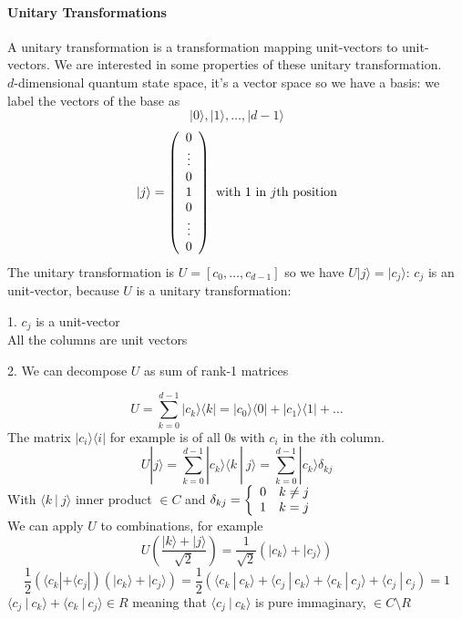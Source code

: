 \documentclass[10pt]{report}
\begin{document}
\paragraph{Unitary Transformations} A unitary transformation is a transformation mapping unit-vectors to unit-vectors. We are interested in some properties of these unitary transformation.\\
$d$-dimensional quantum state space, it's a vector space so we have a basis: we label the vectors of the base as $$|0\rangle, |1\rangle,\ldots,|d-1\rangle$$
$$|j\rangle = \left(\begin{array}{c}
0\\\vdots\\0\\1\\0\\\vdots\\0
\end{array}\right)\hbox{ with }1\hbox{ in }j\hbox{th position}$$
The unitary transformation is $U = [c_0,\ldots,c_{d-1}]$ so we have $U|j\rangle = |c_j\rangle$: $c_j$ is an unit-vector, because $U$ is a unitary transformation:
\begin{list}{}{}
	\item[1.] $c_j$ is a unit-vector\\All the columns are unit vectors
	\item[2.] We can decompose $U$ as sum of rank-1 matrices
\end{list}
$$U=\sum_{k=0}^{d-1}|c_k\rangle\langle k| = |c_0\rangle\langle 0| + |c_1\rangle\langle 1| + \ldots$$
The matrix $|c_i\rangle\langle i|$ for example is of all 0s with $c_i$ in the $i$th column. $$U|j\rangle = \sum_{k=0}^{d-1}|c_k\rangle\langle k\:|\:j\rangle = \sum_{k=0}^{d-1} |c_k\rangle\delta_{kj}$$
With $\langle k\:|\:j\rangle$ inner product $\in C$ and $\delta_{kj} = \left\{\begin{array}{l l}
0&k\neq j\\
1&k = j
\end{array}\right.$\\
We can apply $U$ to combinations, for example $$U\left(\frac{|k\rangle + |j\rangle}{\sqrt{2}}\right) = \frac{1}{\sqrt{2}}(|c_k\rangle + |c_j\rangle)$$
$$\frac{1}{2}(\langle c_k|+\langle c_j|)(|c_k\rangle + |c_j\rangle) = \frac{1}{2}\left(\langle c_k\:|\:c_k\rangle + \langle c_j\:|\:c_k\rangle + \langle c_k\:|\:c_j\rangle + \langle c_j\:|\:c_j\right)=1$$
$\langle c_j\:|\:c_k\rangle + \langle c_k\:|\:c_j\rangle \in R$ meaning that $\langle c_j\:|\:c_k\rangle$ is pure immaginary, $\in C\setminus R$\\\\
\end{document}
